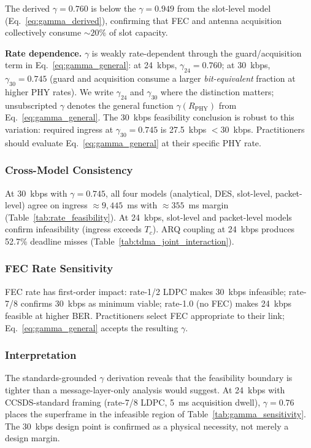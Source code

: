 \documentclass[journal]{IEEEtran}
\begin{document}
The derived $\gamma = 0.760$ is below the $\gamma = 0.949$ from the slot-level model (Eq.~\ref{eq:gamma_derived}), confirming that FEC and antenna acquisition collectively consume ${\sim}20\%$ of slot capacity.

\textbf{Rate dependence.} $\gamma$ is weakly rate-dependent through the guard/acquisition term in Eq.~\ref{eq:gamma_general}: at 24~kbps, $\gamma_{24} = 0.760$; at 30~kbps, $\gamma_{30} = 0.745$ (guard and acquisition consume a larger \emph{bit-equivalent} fraction at higher PHY rates). We write $\gamma_{24}$ and $\gamma_{30}$ where the distinction matters; unsubscripted $\gamma$ denotes the general function $\gamma(R_{\text{PHY}})$ from Eq.~\ref{eq:gamma_general}. The 30~kbps feasibility conclusion is robust to this variation: required ingress at $\gamma_{30} = 0.745$ is 27.5~kbps $< 30$~kbps. Practitioners should evaluate Eq.~\ref{eq:gamma_general} at their specific PHY rate.

\subsubsection{Cross-Model Consistency}

At 30~kbps with $\gamma = 0.745$, all four models (analytical, DES, slot-level, packet-level) agree on ingress $\approx 9{,}445$~ms with $\approx 355$~ms margin (Table~\ref{tab:rate_feasibility}). At 24~kbps, slot-level and packet-level models confirm infeasibility (ingress exceeds $T_c$). ARQ coupling at 24~kbps produces 52.7\% deadline misses (Table~\ref{tab:tdma_joint_interaction}).

\subsubsection{FEC Rate Sensitivity}

FEC rate has first-order impact: rate-1/2 LDPC makes 30~kbps infeasible; rate-7/8 confirms 30~kbps as minimum viable; rate-1.0 (no FEC) makes 24~kbps feasible at higher BER. Practitioners select FEC appropriate to their link; Eq.~\ref{eq:gamma_general} accepts the resulting $\gamma$.

\subsubsection{Interpretation}

The standards-grounded $\gamma$ derivation reveals that the feasibility boundary is tighter than a message-layer-only analysis would suggest. At 24~kbps with CCSDS-standard framing (rate-7/8 LDPC, 5~ms acquisition dwell), $\gamma = 0.76$ places the superframe in the infeasible region of Table~\ref{tab:gamma_sensitivity}. The 30~kbps design point is confirmed as a physical necessity, not merely a design margin.
\end{document}
